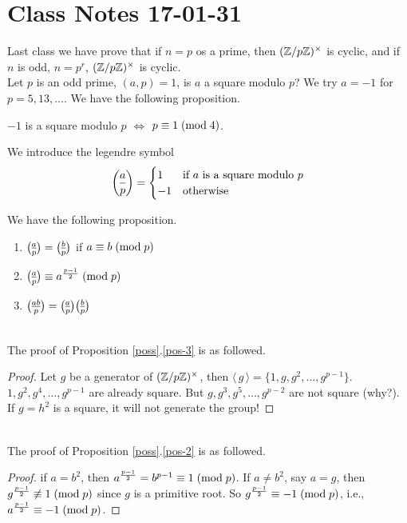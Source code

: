 \section{Class Notes 17-01-31}
Last class we have prove that if $n=p$ os a prime, then $(\mathbb{Z}/p\mathbb{Z})^{\times}$ is cyclic, and if $n$ is odd, $n=p^r$, $(\mathbb{Z}/p\mathbb{Z})^{\times}$ is cyclic.\notcomplete
\mbox{}\\
Let $p$ is an odd prime, $(a,p) = 1$, is $a$ a square modulo $p$? We try $a=-1$ for $p=5,13,\ldots$. We have the following proposition.
\begin{proposition}
	$-1$ is a square modulo $p$ $\Longleftrightarrow$ $p\equiv 1\;(\mbox{mod}{\;4})$.
\end{proposition}
\begin{definition}
	We introduce the legendre symbol 
	\begin{equation*}
	\leg{a}{p}=\begin{cases}
	1 & \text{if $a$ is a square modulo $p$}\\
	-1 & \text{otherwise}
	\end{cases}
	\end{equation*}
\end{definition}
We have the following proposition.
\begin{proposition}\mbox{}\label{poss}
	\begin{enumerate}
		\item
		$\leg{a}{p} = \leg{b}{p}$ if $a\equiv b\;(\mbox{mod}{\;p})$
		\item\label{pos-2}
		$\leg{a}{p}\con{a^{\frac{p-1}{2}}}{p}$
		\item\label{pos-3}
		$\leg{ab}{p} = \leg{a}{p}\leg{b}{p}$
	\end{enumerate}
\end{proposition}
\mbox{}\\The proof of Proposition \ref{poss}.\ref{pos-3} is as followed.
\begin{proof}
Let $g$ be a generator of $(\mathbb{Z}/p\mathbb{Z})^\times$, then  $\langle\,g\,\rangle = \{1,g,g^2,\ldots,g^{p-1} \}$. $1,g^2,g^4,\ldots, g^{p-1}$ are already square. But $g,g^3,g^5,\ldots, g^{p-2}$ are not square (why?). If $g=h^2$ is a square, it will not generate the group!
\end{proof}
\mbox{}\\The proof of Proposition \ref{poss}.\ref{pos-2} is as followed.
\begin{proof}
if $a=b^2$, then $a^{\frac{p-1}{2}}=b^{p-1}\equiv 1\;(\mbox{mod}{\;p})$. If $a\ne b^2$, say $a=g$, then $g^{\frac{p-1}{2}}\not\equiv 1\;(\mbox{mod}{\;p})$ since $g$ is a primitive root. So $g^{\frac{p-1}{2}}\equiv -1\;(\mbox{mod}{\;p})$, i.e., $a^{\frac{p-1}{2}}\equiv -1\;(\mbox{mod}{\;p})$.
\end{proof}
